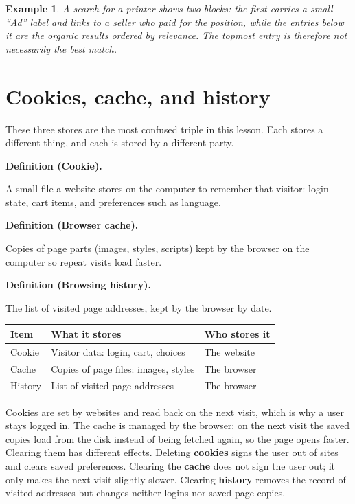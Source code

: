 \documentclass[11pt]{article}
\newtheorem{example}{Example}[section]
\newenvironment{definitionbox}[1]{%
  \par\noindent\textbf{Definition (#1).}\ \itshape
}{\par\vspace{0.3em}}
\begin{document}
\begin{example}
A search for a printer shows two blocks: the first carries a small ``Ad''
label and links to a seller who paid for the position, while the entries
below it are the organic results ordered by relevance. The topmost entry is
therefore not necessarily the best match.
\end{example}

\section{Cookies, cache, and history}
These three stores are the most confused triple in this lesson. Each stores a
different thing, and each is stored by a different party.

\begin{definitionbox}{Cookie}
A small file a website stores on the computer to remember that visitor:
login state, cart items, and preferences such as language.
\end{definitionbox}

\begin{definitionbox}{Browser cache}
Copies of page parts (images, styles, scripts) kept by the browser on the
computer so repeat visits load faster.
\end{definitionbox}

\begin{definitionbox}{Browsing history}
The list of visited page addresses, kept by the browser by date.
\end{definitionbox}

\begin{center}
\begin{tabular}{p{}p{}p{}}
\toprule
\textbf{Item} & \textbf{What it stores} & \textbf{Who stores it} \\
\midrule
Cookie & Visitor data: login, cart, choices & The website \\
Cache & Copies of page files: images, styles & The browser \\
History & List of visited page addresses & The browser \\
\bottomrule
\end{tabular}
\end{center}

Cookies are set by websites and read back on the next visit, which is why a
user stays logged in. The cache is managed by the browser: on the next visit
the saved copies load from the disk instead of being fetched again, so the
page opens faster. Clearing them has different effects. Deleting
\textbf{cookies} signs the user out of sites and clears saved preferences.
Clearing the \textbf{cache} does not sign the user out; it only makes the
next visit slightly slower. Clearing \textbf{history} removes the record of
visited addresses but changes neither logins nor saved page copies.
\end{document}
